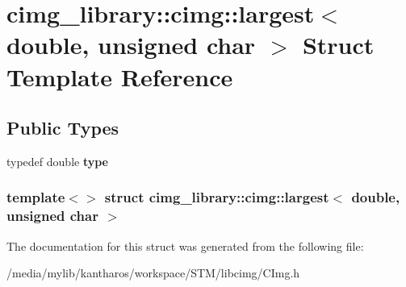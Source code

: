 \hypertarget{structcimg__library_1_1cimg_1_1largest_3_01double_00_01unsigned_01char_01_4}{
\section{cimg\_\-library::cimg::largest$<$ double, unsigned char $>$ Struct Template Reference}
\label{structcimg__library_1_1cimg_1_1largest_3_01double_00_01unsigned_01char_01_4}
}
\subsection*{Public Types}
\begin{DoxyCompactItemize}
\item 
\hypertarget{structcimg__library_1_1cimg_1_1largest_3_01double_00_01unsigned_01char_01_4_a94700f47830734928634b39c6db0888f}{
typedef double {\bfseries type}}
\label{structcimg__library_1_1cimg_1_1largest_3_01double_00_01unsigned_01char_01_4_a94700f47830734928634b39c6db0888f}

\end{DoxyCompactItemize}
\subsubsection*{template$<$$>$ struct cimg\_\-library::cimg::largest$<$ double, unsigned char $>$}



The documentation for this struct was generated from the following file:\begin{DoxyCompactItemize}
\item 
/media/mylib/kantharos/workspace/STM/libcimg/CImg.h\end{DoxyCompactItemize}
